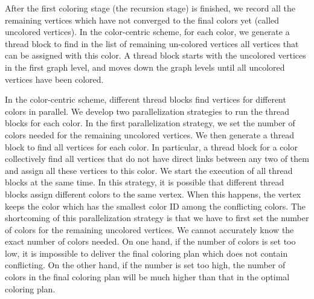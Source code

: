 After the first coloring stage (the recursion stage) is finished, we record all the remaining vertices which have not converged to the final colors yet (called uncolored vertices).  
In the color-centric scheme, for each color, we generate a thread block to find in the list of remaining un-colored vertices all vertices that can be assigned with this color. A thread block starts with the uncolored vertices in the first graph level, and moves down the graph levels until all uncolored vertices have been colored. 

In the color-centric scheme, different thread blocks find vertices for different colors in parallel. We develop two parallelization strategies to run the thread blocks for each color. In the first parallelization strategy, we set the number of colors needed for the remaining uncolored vertices. We then generate a thread block to find all vertices for each color. In particular, a thread block for a color collectively find all vertices that do not have direct links between any two of them and assign all these vertices to this color. We start the execution of all thread blocks at the same time. In this strategy, it is possible that different thread blocks assign different colors to the same vertex. When this happens, the vertex keeps the color which has the smallest color ID among the conflicting colors. The shortcoming of this parallelization strategy is that we have to first set the number of colors for the remaining uncolored vertices. We cannot accurately know the exact number of colors needed. On one hand, if the number of colors is set too low, it is impossible to deliver the final coloring plan which does not contain conflicting. On the other hand, if the number is set too high, the number of colors in the final coloring plan will be much higher than that in the optimal coloring plan. 

